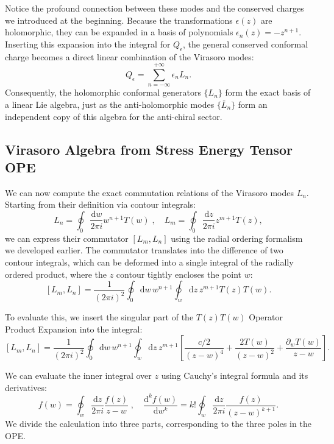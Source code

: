 Notice the profound connection between these modes and the conserved charges we introduced at the beginning. Because the transformations \(\epsilon(z)\) are holomorphic, they can be expanded in a basis of polynomials \(\epsilon_n(z) = -z^{n+1}\). Inserting this expansion into the integral for \(Q_{\epsilon}\), the general conserved conformal charge becomes a direct linear combination of the Virasoro modes:
\begin{equation}
    Q_{\epsilon} = \sum_{n=-\infty}^{+\infty} \epsilon_n L_n.
    \label{eq:conformal_charge_virasoro}
\end{equation}
Consequently, the holomorphic conformal generators \(\{L_n\}\) form the exact basis of a linear Lie algebra, just as the anti-holomorphic modes \(\{\bar{L}_n\}\) form an independent copy of this algebra for the anti-chiral sector.

\subsection{Virasoro Algebra from Stress Energy Tensor OPE}

We can now compute the exact commutation relations of the Virasoro modes \(L_n\). Starting from their definition via contour integrals:
\[
    L_n = \oint_0 \frac{\mathrm{d}w}{2\pi i} w^{n+1} T(w) \;, \quad L_m = \oint_0 \frac{\mathrm{d}z}{2\pi i} z^{m+1} T(z),
\]
we can express their commutator \([L_m, L_n]\) using the radial ordering formalism we developed earlier. The commutator translates into the difference of two contour integrals, which can be deformed into a single integral of the radially ordered product, where the \(z\) contour tightly encloses the point \(w\):
\[
    [L_m, L_n] = \frac{1}{(2\pi i)^2} \oint_0 \mathrm{d}w \, w^{n+1} \oint_w \mathrm{d}z \, z^{m+1} T(z)T(w).
\]

To evaluate this, we insert the singular part of the \(T(z)T(w)\) Operator Product Expansion into the integral:
\[
    [L_m, L_n] = \frac{1}{(2\pi i)^2} \oint_0 \mathrm{d}w \, w^{n+1} \oint_w \mathrm{d}z \, z^{m+1} \left[ \frac{c/2}{(z-w)^4} + \frac{2T(w)}{(z-w)^2} + \frac{\partial_w T(w)}{z-w} \right].
\]

We can evaluate the inner integral over \(z\) using Cauchy's integral formula and its derivatives:
\[
    f(w) = \oint_w \frac{\mathrm{d}z}{2\pi i} \frac{f(z)}{z-w} \;, \quad \frac{\mathrm{d}^k f(w)}{\mathrm{d}w^k} = k! \oint_w \frac{\mathrm{d}z}{2\pi i} \frac{f(z)}{(z-w)^{k+1}}.
\]
We divide the calculation into three parts, corresponding to the three poles in the OPE.

